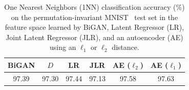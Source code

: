 \begin{table}
\centering
\begin{tabular}{cccccc}
\toprule
BiGAN & $D$ & LR & JLR & AE ($\ell_2$) & AE ($\ell_1$) \\
\midrule
97.39 & 97.30 & 97.44 & 97.13 & 97.58 & 97.63 \\
\bottomrule
\end{tabular}
\caption{
One Nearest Neighbors (1NN) classification accuracy (\%)
on the permutation-invariant MNIST~\citep{mnist}
test set in the feature space learned by BiGAN, Latent Regressor (LR), Joint Latent Regressor (JLR), and an autoencoder (AE) using an $\ell_1$ or $\ell_2$ distance.}
\end{table}
